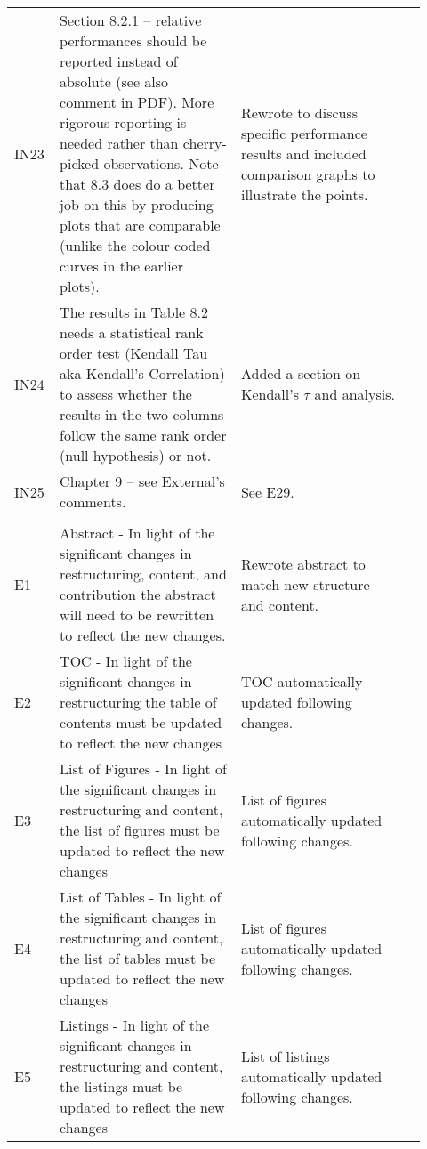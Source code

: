 \begin{longtable}{>{\raggedright} p{0.06\linewidth} | >{\raggedright} p{0.42\linewidth} | >{\raggedright} p{0.39\linewidth} | p{0.045\linewidth}}
    IN23 & Section 8.2.1 – relative performances should be reported instead of absolute (see also comment in PDF). More rigorous reporting is needed rather than cherry-picked observations. Note that 8.3 does do a better job on this by producing plots that are comparable (unlike the colour coded curves in the earlier plots).
    & Rewrote to discuss specific performance results and included comparison graphs to illustrate the points. & \p{dut vs pc} \\

    IN24 & The results in Table 8.2 needs a statistical rank order test (Kendall Tau aka Kendall’s Correlation) to assess whether the results in the two columns follow the same rank order (null hypothesis) or not.
    & Added a section on Kendall's $\tau$ and analysis. & \p{IN24} \\

    IN25 & Chapter 9 – see External’s comments.
    & See E29. & \\

    \hline
    \multicolumn{4}{c}{External Examiner Comments} \\
    \hline

    E1 & Abstract - In light of the significant changes in restructuring, content, and contribution the abstract will need to be rewritten to reflect the new changes.
    & Rewrote abstract to match new structure and content. & \\

    E2 & TOC - In light of the significant changes in restructuring the table of contents must be updated to reflect the new changes
    & TOC automatically updated following changes. & \\

    E3 & List of Figures - In light of the significant changes in restructuring and content, the list of figures must be updated to reflect the new changes
    & List of figures automatically updated following changes. & \\

    E4 & List of Tables - In light of the significant changes in restructuring and content, the list of tables must be updated to reflect the new changes
    & List of figures automatically updated following changes. & \\

    E5 & Listings - In light of the significant changes in restructuring and content, the listings must be updated to reflect the new changes
    & List of listings automatically updated following changes. & \\


\end{longtable}
